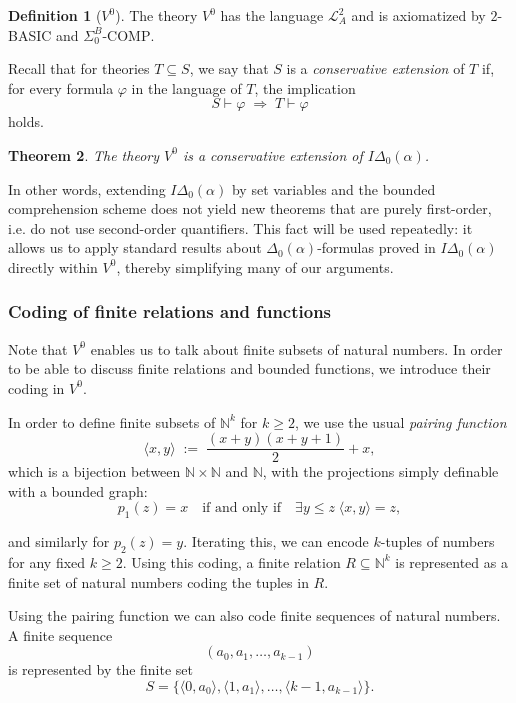 \documentclass{article}
\theoremstyle{plain}
\newtheorem{theorem}{Theorem}[section]
\theoremstyle{definition}
\newtheorem{definition}[theorem]{Definition}
\begin{document}
\begin{definition}[$V^0$]
The theory $V^0$ has the language $\mathcal{L}^2_A$ and is axiomatized by $2$-BASIC and $\Sigma^B_0\text{-COMP}$.
\end{definition}

Recall that for theories $T \subseteq S$, we say that $S$ is a \emph{conservative extension} of $T$ if, for every formula $\varphi$ in the language of $T$, the implication
\[
S \vdash \varphi \;\Rightarrow\; T \vdash \varphi
\]
holds.

\begin{theorem}\label{thm:conservative_extension}
The theory $V^0$ is a conservative extension of $I\Delta_0(\alpha)$.
\end{theorem}

In other words, extending $I\Delta_0(\alpha)$ by set variables and the bounded comprehension scheme does not yield new theorems that are purely first-order, i.e. do not use second-order quantifiers. This fact will be used repeatedly: it allows us to apply standard results about $\Delta_0(\alpha)$-formulas proved in $I\Delta_0(\alpha)$ directly within $V^0$, thereby simplifying many of our arguments.


\subsubsection{Coding of finite relations and functions}\label{coding_relations_functions}
Note that $V^0$ enables us to talk about finite subsets of natural numbers. In order to be able to discuss finite relations and bounded functions, we introduce their coding in $V^0$.


In order to define finite subsets of $\mathbb{N}^k$ for $k\geq 2$, we use the usual \emph{pairing function} 
\[
\langle x, y \rangle \;:=\; \frac{(x+y)(x+y+1)}{2} + x, 
\]
which is a bijection between $\mathbb{N} \times \mathbb{N}$ and $\mathbb{N}$, with the
projections simply definable with a bounded graph:
\[
p_1(z) = x 
\quad\text{if and only if}\quad 
\exists y \le z \; \langle x, y \rangle = z,
\]

\noindent and similarly for $p_2(z) = y$. Iterating this, we can encode $k$-tuples of numbers
for any fixed $k \ge 2$. Using this coding, a finite relation $R \subseteq \mathbb{N}^k$ is represented as a
finite set of natural numbers coding the tuples in $R$.

Using the pairing function we can also code finite sequences of natural
numbers. A finite sequence
\[
(a_0,a_1,\dots,a_{k-1})
\]
is represented by the finite set
\[
S = \{\langle 0,a_0\rangle,\langle 1,a_1\rangle,\dots,\langle k-1,a_{k-1}\rangle\}.
\]
\end{document}
